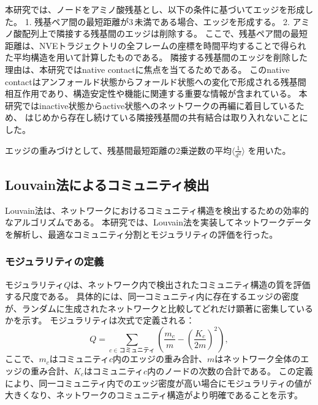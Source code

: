 本研究では、ノードをアミノ酸残基とし、以下の条件に基づいてエッジを形成した。
1. 残基ペア間の最短距離が3\,\text{\AA}未満である場合、エッジを形成する。
2. アミノ酸配列上で隣接する残基間のエッジは削除する。
ここで、残基ペア間の最短距離は、NVEトラジェクトリの全フレームの座標を時間平均することで得られた平均構造を用いて計算したものである。
隣接する残基間のエッジを削除した理由は、本研究ではnative contactに焦点を当てるためである。
このnative contactはアンフォールド状態からフォールド状態への変化で形成される残基間相互作用であり、構造安定性や機能に関連する重要な情報が含まれている。
本研究ではinactive状態からactive状態へのネットワークの再編に着目しているため、
はじめから存在し続けている隣接残基間の共有結合は取り入れないことにした。

エッジの重みづけとして、残基間最短距離の2乗逆数の平均$\langle \frac{1}{d^2} \rangle$ を用いた。

\subsection{Louvain法によるコミュニティ検出}

Louvain法は、ネットワークにおけるコミュニティ構造を検出するための効率的なアルゴリズムである。
本研究では、Louvain法\cite{Blondel2008}を実装してネットワークデータを解析し、最適なコミュニティ分割とモジュラリティの評価を行った。
\subsubsection{モジュラリティの定義}
モジュラリティ$Q$は、ネットワーク内で検出されたコミュニティ構造の質を評価する尺度である。
具体的には、同一コミュニティ内に存在するエッジの密度が、ランダムに生成されたネットワークと比較してどれだけ顕著に密集しているかを示す。
モジュラリティは次式で定義される：
\begin{equation}
Q = \sum_{c \in \text{コミュニティ}} \left( \frac{m_c}{m} - \left( \frac{K_c}{2m} \right)^2 \right),
\end{equation}
ここで、$m_c$はコミュニティ$c$内のエッジの重み合計、$m$はネットワーク全体のエッジの重み合計、$K_c$はコミュニティ$c$内のノードの次数の合計である。
この定義により、同一コミュニティ内でのエッジ密度が高い場合にモジュラリティの値が大きくなり、ネットワークのコミュニティ構造がより明確であることを示す。


